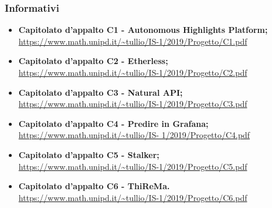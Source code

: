 \subsubsection{Informativi}

\begin{itemize}
\item \textbf {Capitolato d'appalto C1 - Autonomous Highlights Platform;}\\
\url{https://www.math.unipd.it/~tullio/IS-1/2019/Progetto/C1.pdf}
\item \textbf {Capitolato d'appalto C2 - Etherless;}\\
\url{https://www.math.unipd.it/~tullio/IS-1/2019/Progetto/C2.pdf}
\item \textbf {Capitolato d'appalto C3 - Natural API;}\\
\url{https://www.math.unipd.it/~tullio/IS-1/2019/Progetto/C3.pdf}
\item \textbf {Capitolato d'appalto C4 - Predire in Grafana;}\\
\url{https://www.math.unipd.it/~tullio/IS- 1/2019/Progetto/C4.pdf}
\item \textbf {Capitolato d'appalto C5 - Stalker;}\\
\url{https://www.math.unipd.it/~tullio/IS-1/2019/Progetto/C5.pdf}
\item \textbf {Capitolato d'appalto C6 - ThiReMa.}\\
\url{https://www.math.unipd.it/~tullio/IS-1/2019/Progetto/C6.pdf}

\end{itemize}
